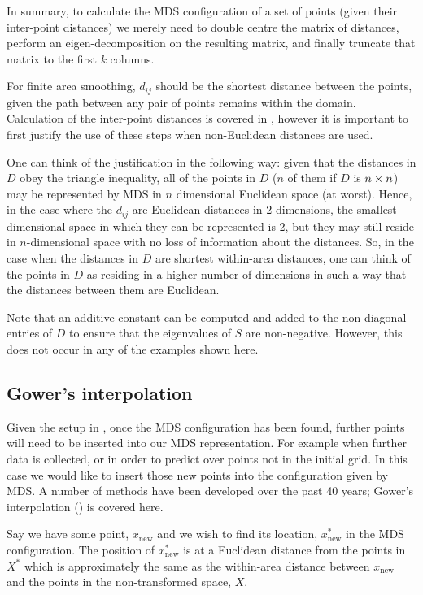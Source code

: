 In summary, to calculate the MDS configuration of a set of points (given their inter-point distances) we merely need to double centre the matrix of distances, perform an eigen-decomposition on the resulting matrix, and finally truncate that matrix to the first $k$ columns.

For finite area smoothing, $d_{ij}$ should be the shortest distance between the points, given the path between any pair of points remains within the domain. Calculation of the inter-point distances is covered in , however it is important to first justify the use of these steps when non-Euclidean distances are used. 

One can think of the justification in the following way: given that the distances in $D$ obey the triangle inequality, all of the points in $D$ ($n$ of them if $D$ is $n \times n$) may be represented by MDS in $n$ dimensional Euclidean space (at worst). Hence, in the case where the $d_{ij}$ are Euclidean distances in 2 dimensions, the smallest dimensional space in which they can be represented is 2, but they may still reside in $n$-dimensional space with no loss of information about the distances. So, in the case when the distances in $D$ are shortest within-area distances, one can think of the points in $D$ as residing in a higher number of dimensions in such a way that the distances between them are Euclidean.

Note that an additive constant can be computed and added to the non-diagonal entries of $D$ to ensure that the eigenvalues of $S$ are non-negative. However, this does not occur in any of the examples shown here.

\subsection{Gower's interpolation} 
\label{gowers}
Given the setup in , once the MDS configuration has been found, further points will need to be inserted into our MDS representation. For example when further data is collected, or in order to predict over points not in the initial grid. In this case we would like to insert those new points into the configuration given by MDS. A number of methods have been developed over the past 40 years; Gower's interpolation (\cite{gower1968}) is covered here.

Say we have some point, $x_{\text{new}}$ and we wish to find its location, $x^*_{\text{new}}$ in the MDS configuration. The position of $x^*_{\text{new}}$ is at a Euclidean distance from the points in $X^*$ which is approximately the same as the within-area distance between $x_{\text{new}}$ and the points in the non-transformed space, $X$. 

